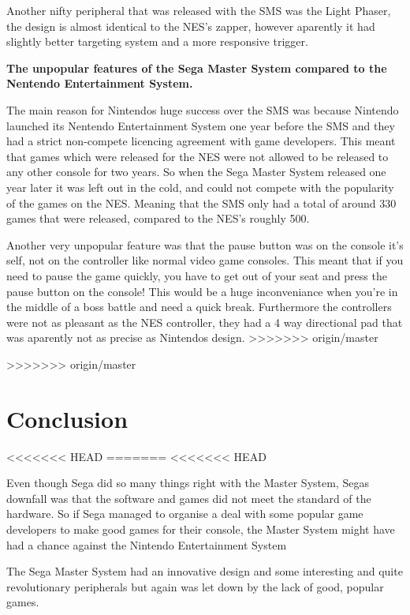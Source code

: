 \documentclass{scrartcl}
\begin{document}
Another nifty peripheral that was released with the SMS was the Light Phaser, the design is almost identical to the NES's zapper, however aparently it had slightly better targeting system and a more responsive trigger. 


\textbf{The unpopular features of the Sega Master System compared to the Nentendo Entertainment System.} \par

The main reason for Nintendos huge success over the SMS was because Nintendo launched its Nentendo Entertainment System one year before the SMS and they had a strict non-compete licencing agreement with game developers. This meant that games which were released for the NES were not allowed to be released to any other console for two years.\cite{Weiss2009} So when the Sega Master System released one year later it was left out in the cold, and could not compete with the popularity of the games on the NES. Meaning that the SMS only had a total of around 330 games that were released, compared to the NES's roughly 500. \cite{russell}

Another very unpopular feature was that the pause button was on the console it's self, not on the controller like normal video game consoles. This meant that if you need to pause the game quickly, you have to get out of your seat and press the pause button on the console! This would be a huge inconveniance when you're in the middle of a boss battle and need a quick break. Furthermore the controllers were not as pleasant as the NES controller, they had a 4 way directional pad that was aparently not as precise as Nintendos design.\cite{Weiss2009}
>>>>>>> origin/master


>>>>>>> origin/master


\section{Conclusion}

<<<<<<< HEAD
=======
<<<<<<< HEAD


Even though Sega did so many things right with the Master System, Segas downfall was that the software and games did not meet the standard of the hardware. So if Sega managed to organise a deal with some popular game developers to make good games for their console, the Master System might have had a chance against the Nintendo Entertainment System

The Sega Master System had an innovative design and some interesting and quite revolutionary peripherals but again was let down by the lack of good, popular games. 
\end{document}
